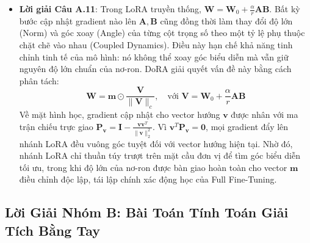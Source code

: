 \begin{itemize}
  \item \textbf{Lời giải Câu A.11}:
  Trong LoRA truyền thống, $\mathbf{W} = \mathbf{W}_0 + \frac{\alpha}{r}\mathbf{A}\mathbf{B}$. Bất kỳ bước cập nhật gradient nào lên $\mathbf{A}, \mathbf{B}$ cũng đồng thời làm thay đổi độ lớn (Norm) và góc xoay (Angle) của từng cột trọng số theo một tỷ lệ phụ thuộc chặt chẽ vào nhau (Coupled Dynamics). Điều này hạn chế khả năng tinh chỉnh tinh tế của mô hình: nó không thể xoay góc biểu diễn mà vẫn giữ nguyên độ lớn chuẩn của nơ-ron.
  DoRA giải quyết vấn đề này bằng cách phân tách:
  \begin{equation*}
  \mathbf{W} = \mathbf{m} \odot \frac{\mathbf{V}}{\|\mathbf{V}\|_c}, \quad \text{với } \mathbf{V} = \mathbf{W}_0 + \frac{\alpha}{r}\mathbf{A}\mathbf{B}
  \end{equation*}
  Về mặt hình học, gradient cập nhật cho vector hướng $\mathbf{v}$ được nhân với ma trận chiếu trực giao $\mathbf{P}_{\mathbf{v}} = \mathbf{I} - \frac{\mathbf{v}\mathbf{v}^T}{\|\mathbf{v}\|_2^2}$. Vì $\mathbf{v}^T \mathbf{P}_{\mathbf{v}} = \mathbf{0}$, mọi gradient đẩy lên nhánh LoRA đều vuông góc tuyệt đối với vector hướng hiện tại. Nhờ đó, nhánh LoRA chỉ thuần túy trượt trên mặt cầu đơn vị để tìm góc biểu diễn tối ưu, trong khi độ lớn của nơ-ron được bàn giao hoàn toàn cho vector $\mathbf{m}$ điều chỉnh độc lập, tái lập chính xác động học của Full Fine-Tuning.
\end{itemize}

\subsection{Lời Giải Nhóm B: Bài Toán Tính Toán Giải Tích Bằng Tay}

